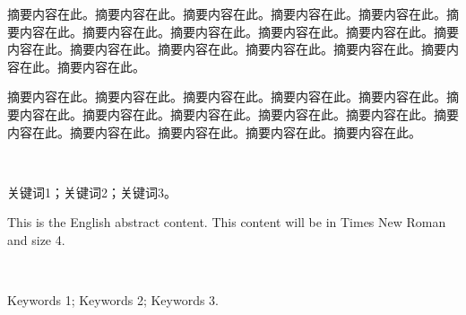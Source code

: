 \newpage
\nopagenumber

\begin{abstractC}
摘要内容在此。摘要内容在此。摘要内容在此。摘要内容在此。摘要内容在此。摘要内容在此。摘要内容在此。摘要内容在此。摘要内容在此。摘要内容在此。摘要内容在此。摘要内容在此。摘要内容在此。摘要内容在此。摘要内容在此。摘要内容在此。摘要内容在此。

摘要内容在此。摘要内容在此。摘要内容在此。摘要内容在此。摘要内容在此。摘要内容在此。摘要内容在此。摘要内容在此。摘要内容在此。摘要内容在此。摘要内容在此。摘要内容在此。摘要内容在此。摘要内容在此。摘要内容在此。
\end{abstractC}
~\\
\begin{keywordsC}
关键词1；关键词2；关键词3。
\end{keywordsC}

\newpage
\nopagenumber
\begin{abstractE}
This is the English abstract content. This content will be in Times New Roman and size 4.
\end{abstractE}
~\\
\begin{keywordsE}
Keywords 1; Keywords 2; Keywords 3.
\end{keywordsE}